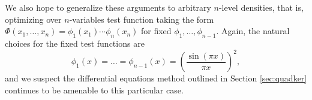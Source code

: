 \documentclass[12pt, reqno]{amsart}
\numberwithin{equation}{section}
\theoremstyle{definition}
\theoremstyle{remark}
\begin{document}
We also hope to generalize these arguments to arbitrary $n$-level densities, that is, optimizing over $n$-variables test function taking the form $\Phi(x_1, \dots, x_n) = \phi_1 (x_1) \cdots \phi_n (x_n)$ for fixed $\phi_1, \dots, \phi_{n - 1}$. Again, the natural choices for the fixed test functions are 
	\[ \phi_1 (x) = \dots = \phi_{n - 1} (x) = \left( \frac{\sin (\pi x)}{\pi x} \right)^2, \]
and we suspect the differential equations method outlined in Section \ref{sec:quadker} continues to be amenable to this particular case. 	


\end{document}
